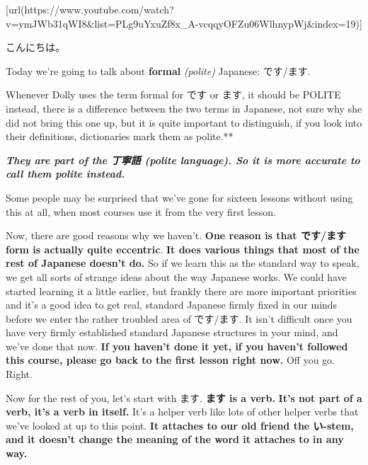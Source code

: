 \startsectionlevel[title={{\bf 17. Polite Japanese and the volitional}},reference={polite-japanese-and-the-volitional}]

[url(https://www.youtube.com/watch?v=ymJWb31qWI8&list=PLg9uYxuZf8x_A-vcqqyOFZu06WlhnypWj&index=19)]

こんにちは。

Today we're going to talk about {\bf formal} {\em (polite)} Japanese: です/ます.

Whenever Dolly uses the term formal for です or ます, it should be POLITE instead, there is a difference between the two terms in Japanese, not sure why she did not bring this one up, but it is quite important to distinguish, if you look into their definitions, dictionaries mark them as polite.**

{\bf {\em They are part of the 丁寧語 (polite language). So it is more accurate to call them polite instead.}}

Some people may be surprised that we've gone for sixteen lessons without using this at all, when most courses use it from the very first lesson.

{}

Now, there are good reasons why we haven't. {\bf One reason is that です/ます form is actually quite eccentric}. {\bf It does various things that most of the rest of Japanese doesn't do.} So if we learn this as the standard way to speak, we get all sorts of strange ideas about the way Japanese works. We could have started learning it a little earlier, but frankly there are more important priorities and it's a good idea to get real, standard Japanese firmly fixed in our minds before we enter the rather troubled area of です/ます. It isn't difficult once you have very firmly established standard Japanese structures in your mind, and we've done that now. {\bf If you haven't done it yet, if you haven't followed this course, please go back to the first lesson right now.} Off you go. Right.

\startsectionlevel[title={ます},reference={ます}]

Now for the rest of you, let's start with ます. {\bf ます is a verb.} {\bf It's not part of a verb, it's a verb in itself.} It's a helper verb like lots of other helper verbs that we've looked at up to this point. {\bf It attaches to our old friend the い-stem, and it doesn't change the meaning of the word it attaches to in any way.}

